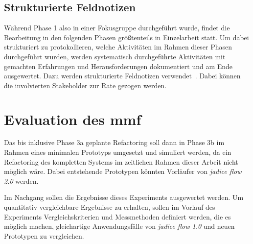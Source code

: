 \subsection{Strukturierte Feldnotizen}
\label{sec:structured-field-notes}

Während Phase 1 also in einer Fokusgruppe durchgeführt wurde, findet die Bearbeitung in den folgenden Phasen größtenteils in Einzelarbeit statt.
Um dabei strukturiert zu protokollieren, welche Aktivitäten im Rahmen dieser Phasen durchgeführt wurden, werden systematisch durchgeführte Aktivitäten mit gemachten Erfahrungen und Herausforderungen dokumentiert und am Ende ausgewertet. 
Dazu werden strukturierte Feldnotizen verwendet~\cite{seaman2008qualitative}.
Dabei können die involvierten Stakeholder zur Rate gezogen werden.


\section{Evaluation des \gls{mmf}}

Das bis inklusive Phase 3a geplante Refactoring soll dann in Phase 3b im Rahmen eines minimalen Prototyps umgesetzt und simuliert werden, da ein Refactoring des kompletten Systems im zeitlichen Rahmen dieser Arbeit nicht möglich wäre.
Dabei entstehende Prototypen könnten Vorläufer von \emph{jadice flow 2.0} werden.

Im Nachgang sollen die Ergebnisse dieses Experiments ausgewertet werden. Um quantitativ vergleichbare Ergebnisse zu erhalten, sollen im Vorlauf des Experiments Vergleichskriterien und Messmethoden definiert werden, die es möglich machen, gleichartige Anwendungsfälle von \emph{jadice flow 1.0} und neuen Prototypen zu vergleichen.
